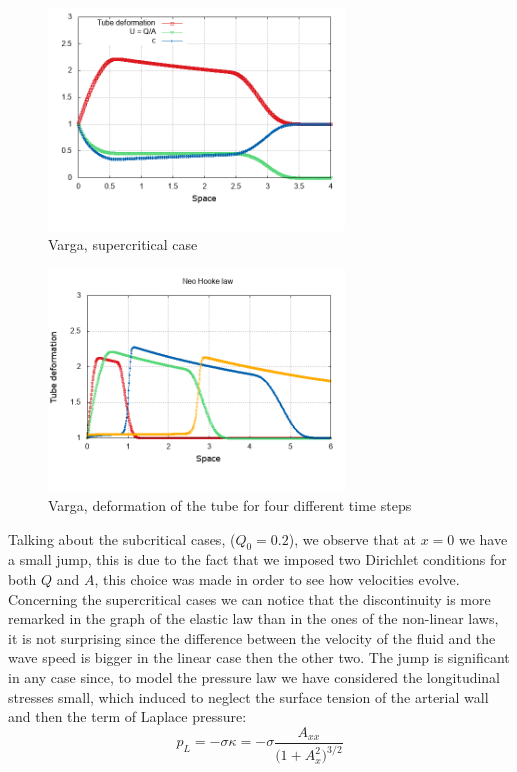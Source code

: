 \documentclass[12pt,a4paper]{article}
\numberwithin{equation}{section}
\begin{document}
\begin{figure}[H]
  \centering
    \includegraphics[width=0.7\textwidth]{Varga_Q1_super.png}
    \caption{Varga, supercritical case}
    \label{fig:Varga_super}
\end{figure}
\begin{figure}[H]
	\centering
    \includegraphics[width=0.7\textwidth]{Varga_Q1.png}
    \caption{Varga, deformation of the tube for four different time steps}
    \label{fig:Varga_flux}
\end{figure}
\noindent
Talking about the subcritical cases, ($Q_0 = 0.2$), we observe that at $x = 0$ we have a small jump, this is due to the fact that we imposed two Dirichlet conditions for both $Q$ and $A$, this choice was made in order to see how velocities evolve.\\
Concerning the supercritical cases we can notice that the discontinuity is more remarked in the graph of the elastic law than in the ones of the non-linear laws, it is not surprising since the difference between the velocity of the fluid and the wave speed is bigger in the linear case then the other two. The jump is significant in any case since, to model the pressure law we have considered the longitudinal stresses small, which induced to neglect the surface tension of the arterial wall and then the term of Laplace pressure:
\begin{equation}
p_L = -\sigma \kappa = -\sigma \frac{A_{xx}}{\big(1+A_x^2\big)^{3/2}}
\end{equation}
\newpage
\end{document}
